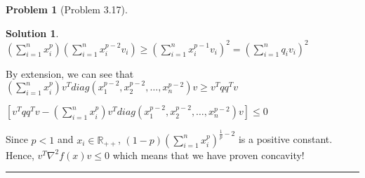 \documentclass{article}
\theoremstyle{definition}
\newtheorem{problem}{Problem}
\def\fline{\rule{0.75\linewidth}{0.5pt}}
\newcommand{\finishline}{\begin{center}\fline\end{center}}
\newtheorem*{solution*}{Solution}
\newenvironment{solution}{\begin{solution*}}{{\finishline} \end{solution*}}
\begin{document}
\begin{problem} [Problem 3.17]
\begin{solution}
    $(\sum_{i=1}^{n} x_i^p)  (\sum_{i=1}^{n} x_i^{p - 2} v_i) \geq (\sum_{i=1}^{n} x_i^{p - 1} v_i)^2 = (\sum_{i=1}^{n} q_i v_i)^2$ \newline 

    By extension, we can see that \newline 
    $(\sum_{i=1}^{n} x_i^p) v^T diag(x_1^{p - 2}, x_2^{p - 2}, \dots, x_n^{p - 2}) v \geq v^Tqq^Tv$ \newline 

    $[v^Tqq^Tv - (\sum_{i=1}^{n} x_i^p) v^T diag(x_1^{p - 2}, x_2^{p - 2}, \dots, x_n^{p - 2}) v] \leq 0$

    Since $p < 1$ and $x_i \in \mathbb{R}_{++}$, $(1 - p) (\sum_{i=1}^{n} x_i^p)^{\frac{1}{p} - 2}$ is a positive constant. Hence, $v^T \nabla^2f(x) v \leq 0$ which means that we have proven concavity!
    
\end{solution}
\end{problem}
\end{document}
